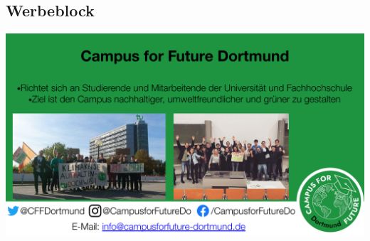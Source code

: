\subsection{Werbeblock}
\begin{frame}
\includegraphics[width=1\linewidth]{bilder/c4f.pdf}
\end{frame}



